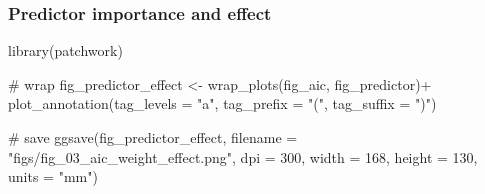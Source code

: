 \documentclass[]{article}
\newenvironment{Shaded}{}{}
\newcommand{\CommentTok}[1]{\textcolor[rgb]{0.00,0.50,0.00}{#1}}
\newcommand{\DataTypeTok}[1]{#1}
\newcommand{\DecValTok}[1]{#1}
\newcommand{\KeywordTok}[1]{\textcolor[rgb]{0.00,0.00,1.00}{#1}}
\newcommand{\NormalTok}[1]{#1}
\newcommand{\OperatorTok}[1]{#1}
\newcommand{\StringTok}[1]{\textcolor[rgb]{0.00,0.50,0.50}{#1}}
\begin{document}
\hypertarget{predictor-importance-and-effect}{%
\subsubsection{Predictor importance and effect}\label{predictor-importance-and-effect}}

\begin{Shaded}
\begin{Highlighting}[]
\KeywordTok{library}\NormalTok{(patchwork)}

\CommentTok{# wrap}
\NormalTok{fig_predictor_effect <-}\StringTok{ }
\StringTok{  }\KeywordTok{wrap_plots}\NormalTok{(fig_aic, fig_predictor)}\OperatorTok{+}
\StringTok{  }\KeywordTok{plot_annotation}\NormalTok{(}\DataTypeTok{tag_levels =} \StringTok{"a"}\NormalTok{,}
                  \DataTypeTok{tag_prefix =} \StringTok{"("}\NormalTok{,}
                  \DataTypeTok{tag_suffix =} \StringTok{")"}\NormalTok{)}

\CommentTok{# save}
\KeywordTok{ggsave}\NormalTok{(fig_predictor_effect,}
       \DataTypeTok{filename =} \StringTok{"figs/fig_03_aic_weight_effect.png"}\NormalTok{,}
       \DataTypeTok{dpi =} \DecValTok{300}\NormalTok{,}
       \DataTypeTok{width =} \DecValTok{168}\NormalTok{, }\DataTypeTok{height =} \DecValTok{130}\NormalTok{, }\DataTypeTok{units =} \StringTok{"mm"}\NormalTok{)}
\end{Highlighting}
\end{Shaded}
\end{document}
